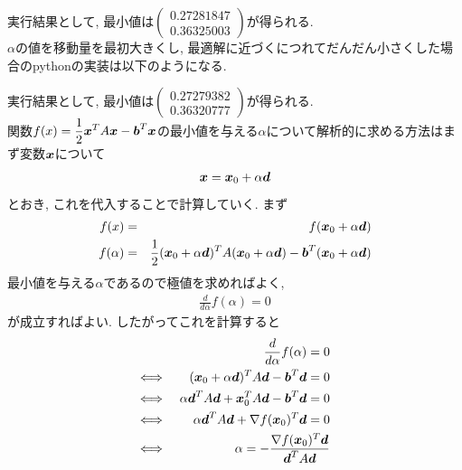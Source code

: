 \documentclass[dvipdfmx,a4j]{jsarticle}
\begin{document}
実行結果として, 最小値は$\begin{pmatrix}0.27281847\\0.36325003\end{pmatrix}$が得られる.\\
$\alpha$の値を移動量を最初大きくし, 最適解に近づくにつれてだんだん小さくした場合のpythonの実装は以下のようになる.

実行結果として, 最小値は$\begin{pmatrix}0.27279382\\0.36320777\end{pmatrix}$が得られる.\\[1cm]
関数$\displaystyle f(x)=\frac{1}{2}\mbox{\boldmath $x$}^{T}A\mbox{\boldmath $x$}-\mbox{\boldmath $b$}^{T}\mbox{\boldmath $x$}$の最小値を与える$\alpha$について解析的に求める方法はまず変数$\mbox{\boldmath $x$}$について
\begin{eqnarray*}
    \mbox{\boldmath $x$} = \mbox{\boldmath $x$}_{0}+\alpha \mbox{\boldmath $d$}
\end{eqnarray*}
とおき, これを代入することで計算していく.
まず
\begin{eqnarray*}
    f(x) &=& f(\mbox{\boldmath $x$}_{0}+\alpha\mbox{\boldmath $d$})\\
    f(\alpha) &=& \frac{1}{2}(\mbox{\boldmath $x$}_{0}+\alpha \mbox{\boldmath $d$})^{T}A(\mbox{\boldmath $x$}_{0}+\alpha \mbox{\boldmath $d$})-\mbox{\boldmath $b$}^{T}(\mbox{\boldmath $x$}_{0}+\alpha \mbox{\boldmath $d$})
\end{eqnarray*}
最小値を与える$\alpha$であるので極値を求めればよく,
\begin{eqnarray*}
    \frac{d}{d\alpha}f(\alpha) = 0
\end{eqnarray*}
が成立すればよい.
したがってこれを計算すると
\begin{eqnarray*}
    &&\frac{d}{d\alpha}f(\alpha) = 0\\
    \Longleftrightarrow \ && (\mbox{\boldmath $x$}_{0}+\alpha \mbox{\boldmath $d$})^{T}A\mbox{\boldmath $d$}-\mbox{\boldmath $b$}^{T}\mbox{\boldmath $d$} = 0\\
    \Longleftrightarrow\ && \alpha \mbox{\boldmath $d$}^{T}A\mbox{\boldmath $d$}+\mbox{\boldmath $x$}_{0}^{T}A\mbox{\boldmath $d$}-\mbox{\boldmath $b$}^{T}\mbox{\boldmath $d$} = 0\\
    \Longleftrightarrow \ && \alpha \mbox{\boldmath $d$}^{T}A\mbox{\boldmath $d$}+\nabla f(\mbox{\boldmath $x$}_{0})^{T}\mbox{\boldmath $d$}=0\\
    \Longleftrightarrow\ && \alpha = -\frac{\nabla f(\mbox{\boldmath $x$}_{0})^{T}\mbox{\boldmath $d$}}{\mbox{\boldmath $d$}^{T}A\mbox{\boldmath $d$}}
\end{eqnarray*}
\end{document}
